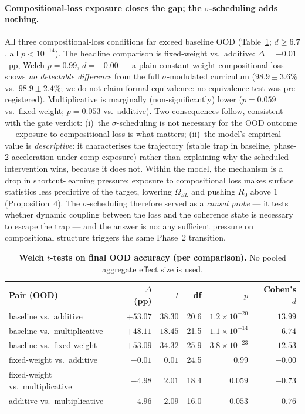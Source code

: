 \documentclass{article}
\theoremstyle{definition}
\begin{document}
\paragraph*{Compositional-loss exposure closes the gap; the
$\sigma$-scheduling adds nothing.}
All three compositional-loss conditions far exceed baseline OOD
(Table~\ref{tab:gate-welch}; $d \geq 6.7$, all $p < 10^{-14}$). The
headline comparison is fixed-weight vs.\ additive: $\Delta =
-0.01$~pp, Welch $p = 0.99$, $d = -0.00$ --- a plain constant-weight
compositional loss shows \emph{no detectable difference} from the full
$\sigma$-modulated curriculum ($98.9 \pm 3.6\%$ vs.\ $98.9 \pm 2.4\%$;
we do not claim formal equivalence: no equivalence test was
pre-registered). Multiplicative is marginally (non-significantly) lower
($p = 0.059$ vs.\ fixed-weight; $p = 0.053$ vs.\ additive). Two
consequences follow, consistent with the gate verdict: (i)~the
$\sigma$-scheduling is not necessary for the OOD outcome --- exposure
to compositional loss is what matters; (ii)~the model's empirical value
is \emph{descriptive}: it characterises the trajectory (stable trap in
baseline, phase-2 acceleration under comp exposure) rather than
explaining why the scheduled intervention wins, because it does not.
Within the model, the mechanism is a drop in shortcut-learning pressure:
exposure to compositional loss makes surface statistics less predictive
of the target, lowering $\Omega_{SL}$ and pushing $R_0$ above $1$
(Proposition~4). The $\sigma$-scheduling therefore served as a
\emph{causal probe} --- it tests whether dynamic coupling between the
loss and the coherence state is necessary to escape the trap --- and
the answer is no: any sufficient pressure on compositional structure
triggers the same Phase~2 transition.

\begin{table}[htbp]
\centering
\small
\caption{\textbf{Welch $t$-tests on final OOD accuracy (per comparison).}
No pooled aggregate effect size is used.}\label{tab:gate-welch}
\begin{tabular}{l r r r r r}
\toprule
\textbf{Pair (OOD)} & \textbf{$\Delta$ (pp)} & \textbf{$t$} & \textbf{df} & \textbf{$p$} & \textbf{Cohen's $d$} \\
\midrule
baseline vs.\ additive & $+53.07$ & $38.30$ & 20.6 & $1.2\times10^{-20}$ & $13.99$ \\
baseline vs.\ multiplicative & $+48.11$ & $18.45$ & 21.5 & $1.1\times10^{-14}$ & $6.74$ \\
baseline vs.\ fixed-weight & $+53.09$ & $34.32$ & 25.9 & $3.8\times10^{-23}$ & $12.53$ \\
fixed-weight vs.\ additive & $-0.01$ & $0.01$ & 24.5 & $0.99$ & $-0.00$ \\
fixed-weight vs.\ multiplicative & $-4.98$ & $2.01$ & 18.4 & $0.059$ & $-0.73$ \\
additive vs.\ multiplicative & $-4.96$ & $2.09$ & 16.0 & $0.053$ & $-0.76$ \\
\bottomrule
\end{tabular}
\end{table}
\end{document}

